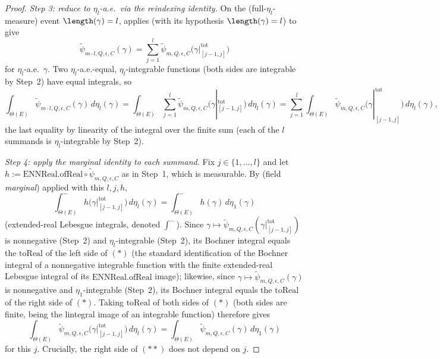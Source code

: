 \begin{proof}
  \emph{Step 3: reduce to $\eta_l$-a.e.\ via the reindexing identity.} On the (full-$\eta_l$-measure)
  event $\length(\gamma)=l$,  applies (with its hypothesis
  $\length(\gamma)=l$) to give
  \[
    \tilde\psi_{m\cdot l,Q,\epsilon,C}(\gamma) = \sum_{j=1}^l
      \tilde\psi_{m,Q,\epsilon,C}\bigl(\gamma|^{\mathrm{tot}}_{[j-1,j]}\bigr)
  \]
  for $\eta_l$-a.e.\ $\gamma$. Two $\eta_l$-a.e.-equal, $\eta_l$-integrable functions (both sides
  are integrable by Step~2) have equal integrals, so
  \[
    \int_{\Theta(E)} \tilde\psi_{m\cdot l,Q,\epsilon,C}(\gamma)\,d\eta_l(\gamma)
    = \int_{\Theta(E)} \sum_{j=1}^l
      \tilde\psi_{m,Q,\epsilon,C}\bigl(\gamma|^{\mathrm{tot}}_{[j-1,j]}\bigr)\,d\eta_l(\gamma)
    = \sum_{j=1}^l \int_{\Theta(E)}
      \tilde\psi_{m,Q,\epsilon,C}\bigl(\gamma|^{\mathrm{tot}}_{[j-1,j]}\bigr) \, d\eta_l(\gamma)
    ,
  \]
  the last equality by linearity of the integral over the finite sum (each of the $l$ summands is
  $\eta_l$-integrable by Step~2).

  \emph{Step 4: apply the marginal identity to each summand.} Fix $j\in\{1,\dotsc,l\}$ and let
  $h := \mathrm{ENNReal.ofReal}\circ\tilde\psi_{m,Q,\epsilon,C}$ as in Step~1, which is measurable.
  By  (field \emph{marginal}) applied with this $l,j,h$,
  \[
    \int^-_{\Theta(E)} h\bigl(\gamma|^{\mathrm{tot}}_{[j-1,j]}\bigr) \, d\eta_l(\gamma)
    = \int^-_{\Theta(E)} h(\gamma) \, d\eta_1(\gamma)
    \tag{$\ast$}
  \]
  (extended-real Lebesgue integrals, denoted $\int^-$). Since $\gamma \mapsto
  \tilde\psi_{m,Q,\epsilon,C}(\gamma|^{\mathrm{tot}}_{[j-1,j]})$ is nonnegative (Step~2) and
  $\eta_l$-integrable (Step~2), its Bochner integral equals the $\mathrm{toReal}$ of the left side
  of $(\ast)$ (the standard identification of the Bochner integral of a nonnegative integrable
  function with the finite extended-real Lebesgue integral of its $\mathrm{ENNReal.ofReal}$
  image); likewise, since $\gamma\mapsto\tilde\psi_{m,Q,\epsilon,C}(\gamma)$ is nonnegative and
  $\eta_1$-integrable (Step~2), its Bochner integral equals the $\mathrm{toReal}$ of the right side
  of $(\ast)$. Taking $\mathrm{toReal}$ of both sides of $(\ast)$ (both sides are finite, being the
  lintegral image of an integrable function) therefore gives
  \[
    \int_{\Theta(E)} \tilde\psi_{m,Q,\epsilon,C}\bigl(\gamma|^{\mathrm{tot}}_{[j-1,j]}\bigr) \,
      d\eta_l(\gamma)
    = \int_{\Theta(E)} \tilde\psi_{m,Q,\epsilon,C}(\gamma) \, d\eta_1(\gamma)
    \tag{$\ast\ast$}
  \]
  for this $j$. Crucially, the right side of $(\ast\ast)$ does not depend on $j$.


\end{proof}
